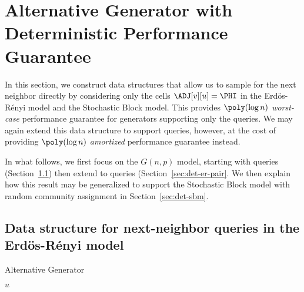 \section{Alternative Generator with Deterministic Performance Guarantee}\label{sec:ER-det}

In this section, we construct data structures that allow us to sample for the next neighbor directly by considering only the cells $\ADJ[v][u]=\PHI$ in the Erd\"{o}s-R\'{e}nyi model and the Stochastic Block model. This provides $\poly(\log n)$ \emph{worst-case} performance guarantee for generators supporting only the  queries. We may again extend this data structure to support  queries, however, at the cost of providing $\poly(\log n)$ \emph{amortized} performance guarantee instead.

In what follows, we first focus on the $G(n,p)$ model, starting with  queries (Section~\ref{sec:det-er}) then extend to  queries (Section~\ref{sec:det-er-pair}. We then explain how this result may be generalized to support the Stochastic Block model with random community assignment in Section~\ref{sec:det-sbm}.

\subsection{Data structure for next-neighbor queries in the Erd\"{o}s-R\'{e}nyi model}\label{sec:det-er}

\begin{algorithm}[H]
\caption{Alternative Generator}
\begin{algorithmic}
	\Else
		\EndIf
	\EndIf
	\State \Return $u$
\EndProcedure
\end{algorithmic}
\label{alg:exact-coin-toss}
\end{algorithm}


